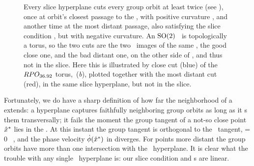 \begin{figure}
   \centering
   \caption{\label{fig:sliceimage}
      Every slice hyperplane cuts every group orbit at least twice (see
      ), once at       orbit's closest passage to the
      {\template}, with positive curvature ,   and another
      time at the most distant passage, also satisfying the slice
      condition , but with negative curvature. An
      $\textrm{SO}(2)$ \rpo\ is topologically a torus, so the two cuts are the
      two \po\ images of the same \rpo, the good close one, and the bad
      distant one, on the other side of {\sset}, and thus not in the
      slice. Here this is illustrated by close cut (blue) of the \rpo\
      $RPO_{36.92}$ torus, \,({\it b}),
      plotted together with the most distant cut (red), in the same slice
      hyperplane, but not in the slice.
   }
\end{figure}





Fortunately, we do have a sharp definition of how far the neighborhood
of a {\template} extends:
a hyperplane captures faithfully neighboring group orbits as long
as it \slice s them transversally; it fails the moment the group tangent of
a not-so close point $\hat{x}^\ast$ lies in the \slice.
At this instant the group tangent is orthogonal to the \slice\ tangent,
\beq
\braket{\groupTan(\sspRSing)}{\sliceTan{}}= 0
\, ,
%
and the phase velocity $\dot{{\bf \phi}}(\hat{x}^\ast)$ in 
diverges.  For points more distant the group orbits have more than one
intersection with the \slice\ hyperplane. It is clear what the trouble
with any single \slice\ hyperplane is: our slice condition and \slice s
are linear.

